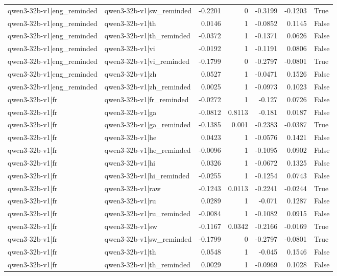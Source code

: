 \begin{table}
\begin{tabular}{l l r r r r l}
qwen3-32b-v1|eng_reminded & qwen3-32b-v1|sw_reminded & -0.2201 & 0 & -0.3199 & -0.1203 & True \\
qwen3-32b-v1|eng_reminded & qwen3-32b-v1|th & 0.0146 & 1 & -0.0852 & 0.1145 & False \\
qwen3-32b-v1|eng_reminded & qwen3-32b-v1|th_reminded & -0.0372 & 1 & -0.1371 & 0.0626 & False \\
qwen3-32b-v1|eng_reminded & qwen3-32b-v1|vi & -0.0192 & 1 & -0.1191 & 0.0806 & False \\
qwen3-32b-v1|eng_reminded & qwen3-32b-v1|vi_reminded & -0.1799 & 0 & -0.2797 & -0.0801 & True \\
qwen3-32b-v1|eng_reminded & qwen3-32b-v1|zh & 0.0527 & 1 & -0.0471 & 0.1526 & False \\
qwen3-32b-v1|eng_reminded & qwen3-32b-v1|zh_reminded & 0.0025 & 1 & -0.0973 & 0.1023 & False \\
qwen3-32b-v1|fr & qwen3-32b-v1|fr_reminded & -0.0272 & 1 & -0.127 & 0.0726 & False \\
qwen3-32b-v1|fr & qwen3-32b-v1|ga & -0.0812 & 0.8113 & -0.181 & 0.0187 & False \\
qwen3-32b-v1|fr & qwen3-32b-v1|ga_reminded & -0.1385 & 0.001 & -0.2383 & -0.0387 & True \\
qwen3-32b-v1|fr & qwen3-32b-v1|he & 0.0423 & 1 & -0.0576 & 0.1421 & False \\
qwen3-32b-v1|fr & qwen3-32b-v1|he_reminded & -0.0096 & 1 & -0.1095 & 0.0902 & False \\
qwen3-32b-v1|fr & qwen3-32b-v1|hi & 0.0326 & 1 & -0.0672 & 0.1325 & False \\
qwen3-32b-v1|fr & qwen3-32b-v1|hi_reminded & -0.0255 & 1 & -0.1254 & 0.0743 & False \\
qwen3-32b-v1|fr & qwen3-32b-v1|raw & -0.1243 & 0.0113 & -0.2241 & -0.0244 & True \\
qwen3-32b-v1|fr & qwen3-32b-v1|ru & 0.0289 & 1 & -0.071 & 0.1287 & False \\
qwen3-32b-v1|fr & qwen3-32b-v1|ru_reminded & -0.0084 & 1 & -0.1082 & 0.0915 & False \\
qwen3-32b-v1|fr & qwen3-32b-v1|sw & -0.1167 & 0.0342 & -0.2166 & -0.0169 & True \\
qwen3-32b-v1|fr & qwen3-32b-v1|sw_reminded & -0.1799 & 0 & -0.2797 & -0.0801 & True \\
qwen3-32b-v1|fr & qwen3-32b-v1|th & 0.0548 & 1 & -0.045 & 0.1546 & False \\
qwen3-32b-v1|fr & qwen3-32b-v1|th_reminded & 0.0029 & 1 & -0.0969 & 0.1028 & False \\

\end{tabular}
\end{table}
